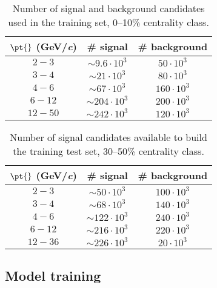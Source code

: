\begin{table}[h!]
  \begin{center}
  \caption{Number of signal and background candidates used in the training set, 0--10\% centrality class.}
  \label{tab:data_avail_010}
    \begin{tabular}{|c|c|c|}
      \hline
      \textbf{$\mathbf{\pt{}}$ (GeV/\textit{c})} &  \textbf{\# signal} & \textbf{\# background} \\
      \hline
      \(2 - 3\) & \(\sim 9.6 \cdot 10^3\) & \(50 \cdot 10^3\) \\
      \hline
      \(3 - 4\) & \(\sim 21 \cdot 10^3\) & \(80 \cdot 10^3\) \\
      \hline
      \(4 - 6\) & \(\sim 67 \cdot 10^3\) & \(160 \cdot 10^3\) \\
      \hline
      \(6 - 12\) & \(\sim 204 \cdot 10^3\) & \(200 \cdot 10^3\) \\
      \hline
      \(12 - 50\) & \(\sim 242 \cdot 10^3\) & \(120 \cdot 10^3\) \\
      \hline
    \end{tabular}
  \end{center}
\end{table}
\begin{table}[h!]
  \begin{center}
  \caption{Number of signal candidates available to build the training test set, 30--50\% centrality class.}
  \label{tab:data_avail_3050}
    \begin{tabular}{|c|c|c|}
    \hline
    \textbf{$\mathbf{\pt{}}$ (GeV/\textit{c})} &  \textbf{\# signal} & \textbf{\# background} \\
    \hline
    \(2 - 3\) & \(\sim 50 \cdot 10^3\) & \(100 \cdot 10^3\) \\
    \hline
    \(3 - 4\) & \(\sim 68 \cdot 10^3\) & \(140 \cdot 10^3\) \\
    \hline
    \(4 - 6\) & \(\sim 122 \cdot 10^3\) & \(240 \cdot 10^3\) \\
    \hline
    \(6 - 12\) & \(\sim 216 \cdot 10^3\) & \(220 \cdot 10^3\) \\
    \hline
    \(12 - 36\) & \(\sim 226 \cdot 10^3\) & \(20 \cdot 10^3\) \\
    \hline
    \end{tabular}
  \end{center}
\end{table}

\subsection{Model training}
